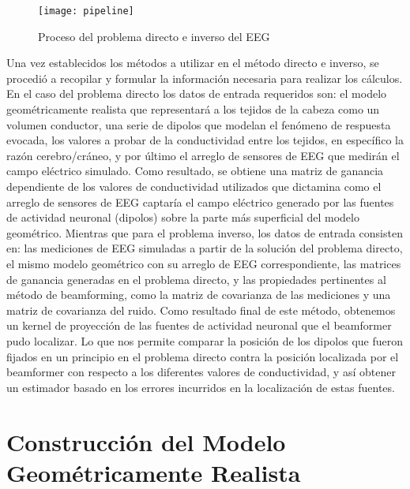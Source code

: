 \begin{figure}[tb]
	\centering
	\texttt{[image: pipeline]}
	\caption{Proceso del problema directo e inverso del EEG }
	\label{fig:methodology:pipeline}
\end{figure}


Una vez establecidos los métodos a utilizar en el método directo e inverso, se procedió a recopilar y formular la información necesaria para realizar los cálculos. En el caso del problema directo los datos de entrada requeridos son: el modelo geométricamente realista que representará a los tejidos de la cabeza como un volumen conductor, una serie de dipolos que modelan el fenómeno de respuesta evocada, los valores a probar de la conductividad entre los tejidos, en específico la razón cerebro/cráneo, y por último el arreglo de sensores de EEG que medirán el campo eléctrico simulado. Como resultado, se obtiene una matriz de ganancia dependiente de los valores de conductividad utilizados que dictamina como el arreglo de sensores de EEG captaría el campo eléctrico generado por las fuentes de actividad neuronal (dipolos) sobre la parte más superficial del modelo geométrico. Mientras que para el problema inverso, los datos de entrada consisten en: las mediciones de EEG simuladas a partir de la solución del problema directo, el mismo modelo geométrico con su arreglo de EEG correspondiente, las matrices de ganancia generadas en el problema directo, y las propiedades pertinentes al método de beamforming, como la matriz de covarianza de las mediciones y una matriz de covarianza del ruido. Como resultado final de este método, obtenemos un kernel de proyección de las fuentes de actividad neuronal que el beamformer pudo localizar. Lo que nos permite comparar la posición de los dipolos que fueron fijados en un principio en el problema directo contra la posición localizada por el beamformer con respecto a los diferentes valores de conductividad, y así obtener un estimador basado en los errores incurridos en la localización de estas fuentes.


\section{Construcción del Modelo Geométricamente Realista}
\label{sec:methodology:model}

